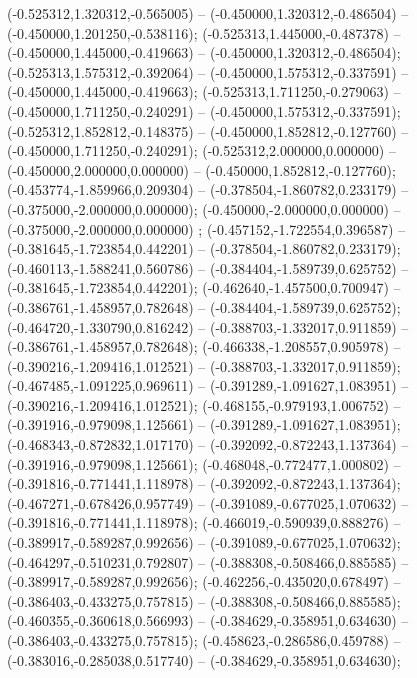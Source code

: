  (-0.525312,1.320312,-0.565005) -- (-0.450000,1.320312,-0.486504) -- (-0.450000,1.201250,-0.538116);
 (-0.525313,1.445000,-0.487378) -- (-0.450000,1.445000,-0.419663) -- (-0.450000,1.320312,-0.486504);
 (-0.525313,1.575312,-0.392064) -- (-0.450000,1.575312,-0.337591) -- (-0.450000,1.445000,-0.419663);
 (-0.525313,1.711250,-0.279063) -- (-0.450000,1.711250,-0.240291) -- (-0.450000,1.575312,-0.337591);
 (-0.525312,1.852812,-0.148375) -- (-0.450000,1.852812,-0.127760) -- (-0.450000,1.711250,-0.240291);
 (-0.525312,2.000000,0.000000) -- (-0.450000,2.000000,0.000000) -- (-0.450000,1.852812,-0.127760);
 (-0.453774,-1.859966,0.209304) -- (-0.378504,-1.860782,0.233179) -- (-0.375000,-2.000000,0.000000);
 (-0.450000,-2.000000,0.000000) -- (-0.375000,-2.000000,0.000000) ;
 (-0.457152,-1.722554,0.396587) -- (-0.381645,-1.723854,0.442201) -- (-0.378504,-1.860782,0.233179);
 (-0.460113,-1.588241,0.560786) -- (-0.384404,-1.589739,0.625752) -- (-0.381645,-1.723854,0.442201);
 (-0.462640,-1.457500,0.700947) -- (-0.386761,-1.458957,0.782648) -- (-0.384404,-1.589739,0.625752);
 (-0.464720,-1.330790,0.816242) -- (-0.388703,-1.332017,0.911859) -- (-0.386761,-1.458957,0.782648);
 (-0.466338,-1.208557,0.905978) -- (-0.390216,-1.209416,1.012521) -- (-0.388703,-1.332017,0.911859);
 (-0.467485,-1.091225,0.969611) -- (-0.391289,-1.091627,1.083951) -- (-0.390216,-1.209416,1.012521);
 (-0.468155,-0.979193,1.006752) -- (-0.391916,-0.979098,1.125661) -- (-0.391289,-1.091627,1.083951);
 (-0.468343,-0.872832,1.017170) -- (-0.392092,-0.872243,1.137364) -- (-0.391916,-0.979098,1.125661);
 (-0.468048,-0.772477,1.000802) -- (-0.391816,-0.771441,1.118978) -- (-0.392092,-0.872243,1.137364);
 (-0.467271,-0.678426,0.957749) -- (-0.391089,-0.677025,1.070632) -- (-0.391816,-0.771441,1.118978);
 (-0.466019,-0.590939,0.888276) -- (-0.389917,-0.589287,0.992656) -- (-0.391089,-0.677025,1.070632);
 (-0.464297,-0.510231,0.792807) -- (-0.388308,-0.508466,0.885585) -- (-0.389917,-0.589287,0.992656);
 (-0.462256,-0.435020,0.678497) -- (-0.386403,-0.433275,0.757815) -- (-0.388308,-0.508466,0.885585);
 (-0.460355,-0.360618,0.566993) -- (-0.384629,-0.358951,0.634630) -- (-0.386403,-0.433275,0.757815);
 (-0.458623,-0.286586,0.459788) -- (-0.383016,-0.285038,0.517740) -- (-0.384629,-0.358951,0.634630);
